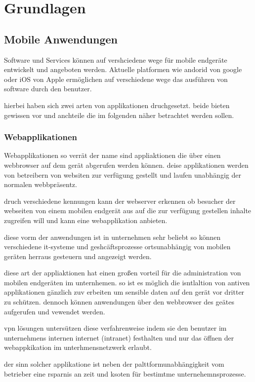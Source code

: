 \section{Grundlagen}
\subsection{Mobile Anwendungen}
Software und Services können auf vershciedene wege für mobile endgeräte entwickelt und angeboten werden. Aktuelle platformen wie andorid von google oder iOS von Apple ermöglichen auf verschiedene wege das ausführen von software durch den benutzer.

hierbei haben sich zwei arten von applikationen druchgesetzt. beide bieten gewissen vor und anchteile die im folgenden näher betrachtet werden sollen.

\subsubsection{Webapplikationen}

Webapplikationen so verrät der name sind appliaktionen die über einen webbrowser auf dem gerät abgerufen werden können. deise applikationen werden von betreibern von websiten zur verfügung gestellt und laufen unabhängig der normalen webbpräsentz.

druch verschiedene kennungen kann der webserver erkennen ob besucher der webseiten von einem mobilen endgerät aus auf die zur verfügung gestellen inhalte zugreifen will und kann eine webapplikation anbieten.

diese vorm der anwendungen ist in unternehmen sehr beliebt so können verschiedene it-systeme und geshcäftsprozesse ortsunabhängig von mobilen geräten herraus gesteuern und angezeigt werden.

diese art der appliaktionen hat einen großen vorteil für die administration von mobilen endgeräten im unternhemen. so ist es möglich die isntlaltion von antiven applikationen gänzlich zuv erbeiten um sensible daten auf den gerät vor dritter zu schützen. dennoch können anwendungen über den webbrowser des geätes aufgerufen und vewendet werden.

vpn lösungen untersützen diese verfahrenweise indem sie den benutzer im unternehmens internen internet (intranet) festhalten und nur das öffnen der webappkikation im unterhmensnetzwerk erlaubt.

der sinn solcher applikatione ist neben der palttformunabhängigkeit vom betrieber eine rsparnis an zeit und ksoten für bestimtme unternehemnsprozesse.

